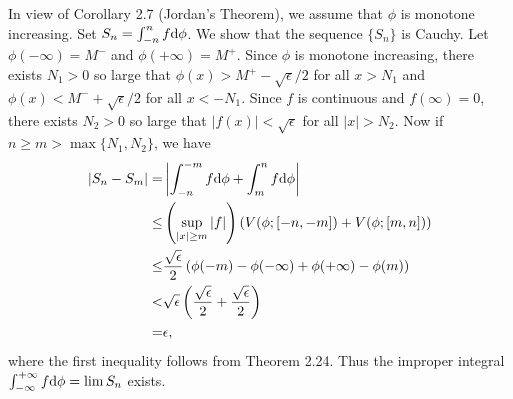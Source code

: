 \begin{exercise}{2.17}
  In view of Corollary 2.7 (Jordan's Theorem),
  we assume that $\phi$ is monotone increasing.
  Set $S_n = \int_{-n}^n f \mathrm{d} \phi$.
  We show that the sequence $\{S_n\}$ is Cauchy.
  Let $\phi(-\infty) = M^-$ and $\phi(+\infty) = M^+$.
  Since $\phi$ is monotone increasing,
  there exists $N_1 > 0$ so large that
  $\phi(x) > M^+ - \sqrt{\epsilon} / 2$ for all $x > N_1$
  and $\phi(x) < M^- + \sqrt{\epsilon} / 2$ for all $x < -N_1$.
  Since $f$ is continuous and $f(\infty) = 0$,
  there exists $N_2 > 0$ so large that
  $|f(x)| < \sqrt{\epsilon}$ for all $|x| > N_2$.
  Now if $n \ge m > \max\{N_1, N_2\}$, we have
  \[
    \begin{aligned}
      \left| S_n - S_m \right| =
      & \left| \int_{-n}^{-m} f \mathrm{d} \phi + \int_m^n f \mathrm{d} \phi \right| \\
      \le & \left( \sup_{|x| \ge m} |f| \right)
      \left( V(\phi;[-n,-m]) + V(\phi;[m,n]) \right) \\
      \le & \frac{\sqrt{\epsilon}}{2}
      \left( \phi(-m) - \phi(-\infty) + \phi(+\infty) - \phi(m) \right) \\
      < & \sqrt{\epsilon}
      \left( \frac{\sqrt{\epsilon}}{2} + \frac{\sqrt{\epsilon}}{2} \right) \\
      = &\epsilon,
    \end{aligned}
  \]
  where the first inequality follows from Theorem 2.24.
  Thus the improper integral $\int_{-\infty}^{+\infty} f \mathrm{d} \phi = \lim S_n$ exists. 
\end{exercise}
